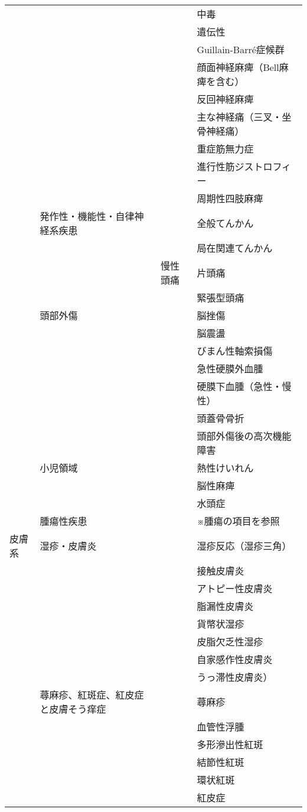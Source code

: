 \begin{xltabular}{\linewidth}{XXXX}
 &  &  & 中毒 \\
 &  &  & 遺伝性 \\
 &  &  & Guillain-Barré症候群 \\
 &  &  & 顔面神経麻痺（Bell麻痺を含む） \\
 &  &  & 反回神経麻痺 \\
 &  &  & 主な神経痛（三叉・坐骨神経痛） \\
 &  &  & 重症筋無力症 \\
 &  &  & 進行性筋ジストロフィー \\
 &  &  & 周期性四肢麻痺 \\
 & 発作性・機能性・自律神経系疾患 &  & 全般てんかん \\
 &  &  & 局在関連てんかん \\
 &  & 慢性頭痛 & 片頭痛 \\
 &  &  & 緊張型頭痛 \\
 & 頭部外傷 &  & 脳挫傷 \\
 &  &  & 脳震盪 \\
 &  &  & びまん性軸索損傷 \\
 &  &  & 急性硬膜外血腫 \\
 &  &  & 硬膜下血腫（急性・慢性） \\
 &  &  & 頭蓋骨骨折 \\
 &  &  & 頭部外傷後の高次機能障害 \\
 & 小児領域 &  & 熱性けいれん \\
 &  &  & 脳性麻痺 \\
 &  &  & 水頭症 \\
 & 腫瘍性疾患 &  & ※腫瘍の項目を参照 \\
皮膚系 & 湿疹・皮膚炎 &  & 湿疹反応（湿疹三角） \\
 &  &  & 接触皮膚炎 \\
 &  &  & アトピー性皮膚炎 \\
 &  &  & 脂漏性皮膚炎 \\
 &  &  & 貨幣状湿疹 \\
 &  &  & 皮脂欠乏性湿疹 \\
 &  &  & 自家感作性皮膚炎 \\
 &  &  & うっ滞性皮膚炎） \\
 & 蕁麻疹、紅斑症、紅皮症と皮膚そう痒症 &  & 蕁麻疹 \\
 &  &  & 血管性浮腫 \\
 &  &  & 多形滲出性紅斑 \\
 &  &  & 結節性紅斑 \\
 &  &  & 環状紅斑 \\
 &  &  & 紅皮症 \\

\end{xltabular}
